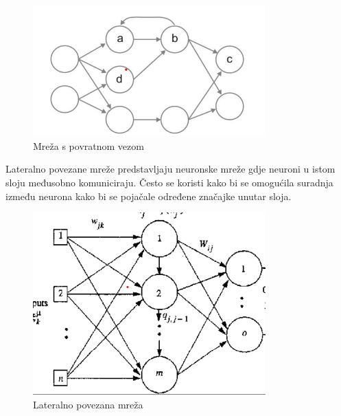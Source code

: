 \FloatBarrier
\begin{figure}[h]
    \centering
    \includegraphics[width=0.8\textwidth]{images/nn-povratna-veza}
    \caption{Mreža s povratnom vezom
    \protect\footnotemark}
    \label{fig:slika5}
\end{figure}
\FloatBarrier
{}

\pagebreak
Lateralno povezane mreže predstavljaju neuronske mreže gdje neuroni u istom sloju međusobno komuniciraju.
Često se koristi kako bi se omogućila suradnja između neurona kako bi se pojačale određene značajke unutar sloja.
\FloatBarrier
\begin{figure}[h]
    \centering
    \includegraphics[width=0.8\textwidth]{images/Lateral-connected-nn}
    \caption{Lateralno povezana mreža
    \protect\footnotemark}
    \label{fig:slika6}
\end{figure}
\FloatBarrier
{}


